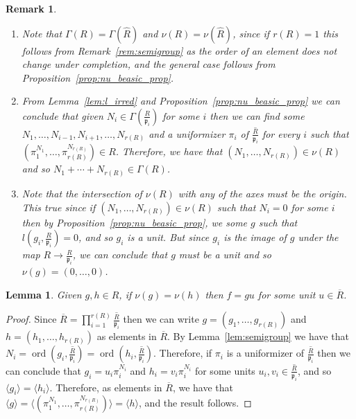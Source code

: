 \documentclass{article}
\newtheorem{lemma}[theorem]{Lemma}
\newtheorem{remark}[theorem]{Remark}
\DeclareMathOperator{\ord}{ord}
\numberwithin{theorem}{section}
\begin{document}
\begin{remark}\label{rem:Gam_comp}
\begin{enumerate}
    \item \textup{Note that $\Gamma(R)=\Gamma(\hat{R})$ and $\nu(R) =\nu(\hat{R})$, since if $r(R)=1$ this follows from Remark~\ref{rem:semigroup} as the order of an element does not change under completion, and the general case follows from Proposition~\ref{prop:nu_beasic_prop}.   }
    \item \textup{From Lemma~\ref{lem:l_irred} and Proposition~\ref{prop:nu_beasic_prop} we can conclude that given $N_i \in \Gamma\left(\frac{R}{\mathfrak{p}_i}\right)$ for some $i$ then we can find some $N_1, \dots, N_{i-1}, N_{i+1}, \dots, N_{r(R)}$ and a uniformizer $\pi_i$ of $\overline{\frac{R}{\mathfrak{p}_i}}$ for every $i$ such that $(\pi_1^{N_1}, \dots, \pi_{r(R)}^{N_{r(R)}}) \in R$. Therefore, we have that $(N_1, \dots, N_{r(R)}) \in \nu(R)$ and so $N_1 + \cdots + N_{r(R)} \in \Gamma(R)$.}
    \item \textup{Note that the intersection of $\nu(R)$ with any of the axes must be the origin. This true since if $(N_1, \dots, N_{r(R)})\in \nu(R)$ such that $N_i=0$ for some $i$ then by Proposition~\ref{prop:nu_beasic_prop}, we some $g$ such that $l(g_i, \frac{R}{\mathfrak{p}_i})=0$, and so $g_i$ is a unit. But since $g_i$ is the image of $g$ under the map $R \to \frac{R}{\mathfrak{p}_i}$, we can conclude that $g$ must be a unit and so $\nu(g)=(0,\dots,0)$. }
\end{enumerate}
\end{remark}


\begin{lemma}\label{lem:ord_ideal}
    Given $g,h \in R$, if $\nu(g)=\nu(h)$ then $f=gu$ for some unit $u \in \overline{R}$. 
\end{lemma}

\begin{proof}
    Since $\overline{R}= \prod_{i=1}^{r(R)} \overline{\frac{R}{\mathfrak{p}_i}}$ then we can write $g=(g_1, \dots, g_{r(R)})$ and $h=(h_1, \dots, h_{r(R)})$ as elements in $\overline{R}$. By Lemma~\ref{lem:semigroup} we have that $N_i= \ord(g_i, \overline{\frac{R}{\mathfrak{p}_i}}) = \ord(h_i, \overline{\frac{R}{\mathfrak{p}_i}})$. Therefore, if $\pi_i$ is a uniformizer of $\overline{\frac{R}{\mathfrak{p}_i}}$ then we can conclude that $g_i = u_i \pi_i^{N_i}$ and $h_i = v_i \pi_i^{N_i}$ for some units $u_i, v_i \in \overline{\frac{R}{\mathfrak{p}_i}}$, and so $\langle g_i \rangle = \langle h_i \rangle$. Therefore, as elements in $\overline{R}$, we have that $\langle g \rangle = \langle (\pi_1^{N_1}, \dots, \pi_{r(R)}^{N_{r(R)}})\rangle = \langle h \rangle$, and the result follows. 
\end{proof}
\end{document}
